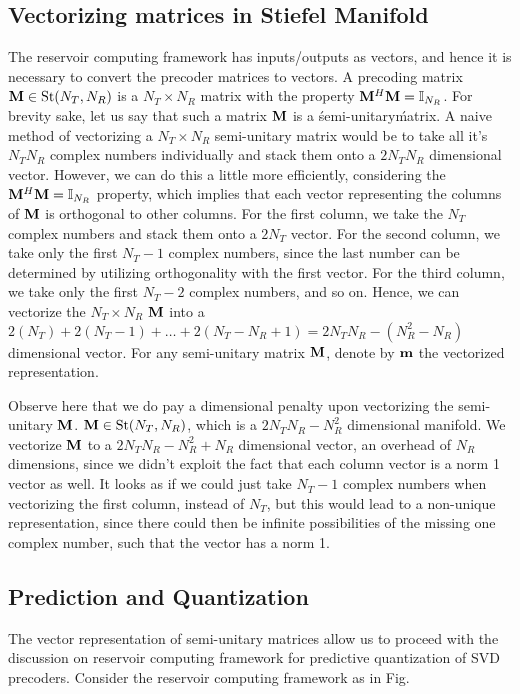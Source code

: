 \documentclass[conference]{IEEEtran}
\begin{document}
\subsection{Vectorizing matrices in Stiefel Manifold}
The reservoir computing framework has inputs/outputs as vectors, and hence it is necessary to convert the precoder matrices to vectors. 
A precoding matrix $\mathcal{{\bf M}} \in \text{St}(N_T,N_R)$ is a $N_T\times N_R$ matrix with the property $\mathcal{{\bf M}}^H\mathcal{{\bf M}}=\mathbb{I}_{N_R}$. 
For brevity sake, let us say that such a matrix $\mathcal{{\bf M}}$ is a \'semi-unitary\' matrix.
A naive method of vectorizing a $N_T\times N_R$ semi-unitary matrix would be to take all it's $N_TN_R$ complex numbers individually and stack them onto a $2N_TN_R$ dimensional vector.
However, we can do this a little more efficiently, considering the $\mathcal{{\bf M}}^H\mathcal{{\bf M}}=\mathbb{I}_{N_R}$ property, which implies that each vector representing the columns of $\mathcal{{\bf M}}$ is orthogonal to other columns.
For the first column, we take the $N_T$ complex numbers and stack them onto a $2N_T$ vector. 
For the second column, we take only the first $N_T-1$ complex numbers, since the last number can be determined by utilizing orthogonality with the first vector. 
For the third column, we take only the first $N_T-2$ complex numbers, and so on. 
Hence, we can vectorize the $N_T\times N_R$ $\mathcal{{\bf M}}$ into a $2(N_T)+2(N_T-1)+\ldots+2(N_T-N_R+1)= 2N_TN_R-(N_R^2-N_R)$ dimensional vector. 
For any semi-unitary matrix $\mathcal{{\bf M}}$, denote by $\mathcal{{\bf m}}$ the vectorized representation.

Observe here that we do pay a dimensional penalty upon vectorizing the semi-unitary $\mathcal{{\bf M}}$. 
$\mathcal{{\bf M}} \in \text{St}(N_T,N_R)$, which is a $2N_TN_R-N_R^2$ dimensional manifold. 
We vectorize $\mathcal{{\bf M}}$ to a $2N_TN_R-N_R^2+N_R$ dimensional vector, an overhead of $N_R$ dimensions, since we didn't exploit the fact that each column vector is a norm 1 vector as well.
It looks as if we could just take $N_T-1$ complex numbers when vectorizing the first column, instead of $N_T$, but this would lead to a non-unique representation, since there could then be infinite possibilities of the missing one complex number, such that the vector has a norm 1.
\subsection{Prediction and Quantization}
The vector representation of semi-unitary matrices allow us to proceed with the discussion on reservoir computing framework for predictive quantization of SVD precoders. Consider the reservoir computing framework as in Fig. %
\end{document}
